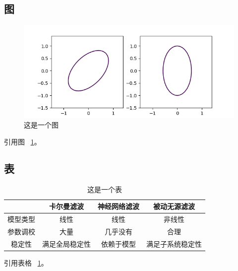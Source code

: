 \documentclass[a4paper, 12pt]{article}
\begin{document}
\subsection{图}
\begin{figure}[ht]
    \centering
    \includegraphics[width = \textwidth]{example.png}
    \caption{这是一个图}
    \label{fig: fig1}
\end{figure}

引用图 ~\ref{fig: fig1}。

\subsection{表}
\begin{table}[ht] %
    \caption{这是一个表}
    \label{tb: filter}
    \centering
    \begin{tabular}{cccc} %
        \hline
        & 卡尔曼滤波 & 神经网络滤波 & 被动无源滤波 \\ 
        \hline
        模型类型 & 线性 & 线性 & 非线性 \\ 
        参数调校 & 大量 & 几乎没有 & 合理 \\ 
        稳定性 & 满足全局稳定性 & 依赖于模型 & 满足子系统稳定性 \\ 
        \hline
        \end{tabular} 
\end{table}

引用表格 ~\ref{tb: filter}。




\end{document}
